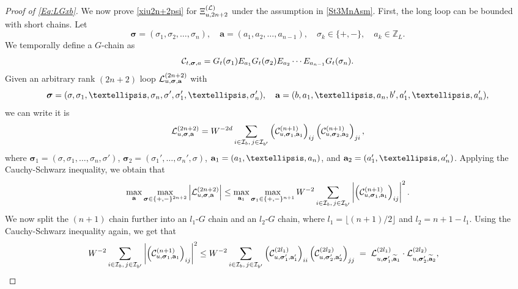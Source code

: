 \documentclass[10pt,reqno]{article}
\newcommand{\wt}{\widetilde}
\newcommand{\ba}{{\bf{a}}}
\theoremstyle{plain} %
\theoremstyle{remark}
\numberwithin{equation}{section}
\begin{document}
\begin{proof}[Proof of \eqref{Eq:LGxb}]
We now  prove \eqref{xiu2n+2psi} for $\Xi^{(\cal L)}_{u, {2n+2}}$ under the assumption in \eqref{St3MnAsm}.  First, the long loop can be bounded with  short chains.  Let 
\[
\boldsymbol{\sigma} = (\sigma_1, \sigma_2, \ldots, \sigma_n), \quad \textbf{a} = (a_1, a_2, \ldots, a_{n-1}), \quad \sigma_k \in \{+, -\}, \quad a_k \in \mathbb{Z}_L.
\]
We temporally define a $G$-chain as
\begin{equation}\label{defC=GEG}
    {\cal C}_{t, \boldsymbol{\sigma}, \textbf{a}} = G_t(\sigma_1) E_{a_1} G_t(\sigma_2) E_{a_2} \cdots E_{a_{n-1}} G_t(\sigma_n).
\end{equation}
 Given an arbitrary rank $(2n+2)$ loop  ${\cal L}^{(2n+2)}_{u,\boldsymbol{\sigma},\ba}$ with 
$$\boldsymbol{\sigma}=(\sigma, \sigma_1,\ldots, \sigma_n, \sigma',\sigma_1',\ldots, \sigma_n'),\quad \ba=(b, a_1 ,\ldots, a_n , b'  , a_1' ,\ldots, a_n' ),$$ 
we can write it is 
\begin{align*}
{\cal L}^{(2n+2)}_{u,\boldsymbol{\sigma},\ba}=W^{-2d}\sum_{i\in{\cal I}_b,\,j\in{\cal I}_{b'}} \left({\cal C}^{(n+1)}_{u,\boldsymbol{\sigma}_1,\ba_1}\right)_{ij} \left({\cal C}^{(n+1)}_{u,\boldsymbol{\sigma}_2,\ba_2}\right)_{ji} ,  
\end{align*}
where $\boldsymbol{\sigma}_1=(\sigma, \sigma_1,\ldots, \sigma_n, \sigma')$, $\boldsymbol{\sigma}_2=(\sigma_1',\ldots, \sigma_n',\sigma)$, $\ba_1=(a_1,\ldots, a_n )$, and $\ba_2=( a_1' ,\ldots, a_n' )$. Applying the Cauchy-Schwarz inequality, we obtain that 
\begin{equation}\label{suauwiioo1}
\max_{\ba }\max_{\boldsymbol{\sigma}\in \{+,-\}^{2n+2}}\left|{\cal L}^{(2n+2)}_{u,\boldsymbol{\sigma},\ba}\right|
\le 
\max_{\ba_1}\max_{\boldsymbol{\sigma}_1 \in\{+,-\}^{n+1}} W^{-2 }\sum_{i\in{\cal I}_b,\,j\in{\cal I}_{b'}}
\left|\left({\cal C}^{(n+1)} _{u,\boldsymbol{\sigma}_1,\ba_1}\right)_{ij} 
\right|^2 .
\end{equation}
We now split the $(n+1)$ chain further into an $l_1$-$G$ chain and an $l_2$-$G$ chain, where $l_1=\lfloor(n+1)/{2}\rfloor$ and $l_2=n+1-l_1$. 
Using the Cauchy-Schwarz inequality again, we get that  \begin{align}\label{suauwiioo2}
    W^{-2 }\sum_{i\in{\cal I}_b,\,j\in{\cal I}_{b'}}
\left|\left({\cal C}^{(n+1)} _{u,\boldsymbol{\sigma}_1,\ba_1}\right)_{ij} 
\right|^2 &\le W^{-2 }\sum_{i\in{\cal I}_b,\,j\in{\cal I}_{b'}} \left({\cal C}^{(2l_1)}_{u,\boldsymbol{\sigma}_1',\ba_1'}\right)_{ii} \left({\cal C}^{(2l_2)}_{u,\boldsymbol{\sigma}_2',\ba_2'}\right)_{jj}  \;=\; {\cal L}^{(2l_1)}_{u,\boldsymbol{\sigma}_1',\wt\ba_1}\cdot {\cal L}^{(2l_2)}_{u,\boldsymbol{\sigma}_2',\wt\ba_2},

\end{align}
\end{proof}
\end{document}
